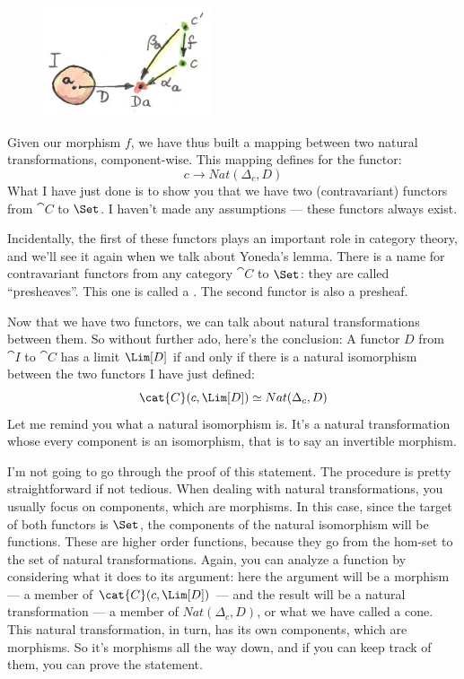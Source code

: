 \begin{figure}[H]
\centering
\includegraphics[width=50mm]{images/natmapping.jpg}
\end{figure}

\noindent
Given our morphism $f$, we have thus built a mapping between two
natural transformations, component-wise. This mapping defines
 for the functor:
\[c \to Nat(\Delta_c, D)\]
What I have just done is to show you that we have two (contravariant)
functors from $\cat{C}$ to $\Set$. I haven't made any assumptions
--- these functors always exist.

Incidentally, the first of these functors plays an important role in
category theory, and we'll see it again when we talk about Yoneda's
lemma. There is a name for contravariant functors from any category
$\cat{C}$ to $\Set$: they are called ``presheaves''. This one is
called a . The second functor is also a
presheaf.

Now that we have two functors, we can talk about natural transformations
between them. So without further ado, here's the conclusion: A functor
$D$ from $\cat{I}$ to $\cat{C}$ has a limit $\Lim[D]$ if and
only if there is a natural isomorphism between the two functors I have
just defined:
\[\cat{C}(c, \Lim[D]) \simeq Nat(\Delta_c, D)\]
Let me remind you what a natural isomorphism is. It's a natural
transformation whose every component is an isomorphism, that is to say
an invertible morphism.

I'm not going to go through the proof of this statement. The procedure
is pretty straightforward if not tedious. When dealing with natural
transformations, you usually focus on components, which are morphisms.
In this case, since the target of both functors is $\Set$, the
components of the natural isomorphism will be functions. These are
higher order functions, because they go from the hom-set to the set of
natural transformations. Again, you can analyze a function by
considering what it does to its argument: here the argument will be a
morphism --- a member of $\cat{C}(c, \Lim[D])$ --- and the result will
be a natural transformation --- a member of $Nat(\Delta_c, D)$, or
what we have called a cone. This natural transformation, in turn, has
its own components, which are morphisms. So it's morphisms all the way
down, and if you can keep track of them, you can prove the statement.

